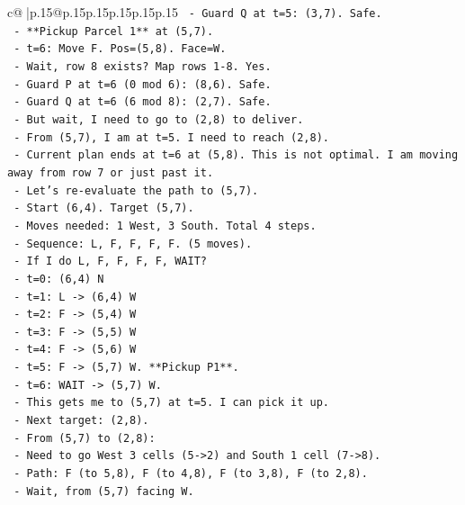 \documentclass{article}
\begin{document}
{\begin{supertabular}{c@{$\;$}|p{.15\linewidth}@{}p{.15\linewidth}p{.15\linewidth}p{.15\linewidth}p{.15\linewidth}p{.15\linewidth}}
{{{\texttt{    {-} Guard Q at t=5: (3,7). Safe.} \\
\texttt{    {-} **Pickup Parcel 1** at (5,7).} \\
\texttt{  {-} t=6: Move F. Pos=(5,8). Face=W.} \\
\texttt{    {-} Wait, row 8 exists? Map rows 1{-}8. Yes.} \\
\texttt{    {-} Guard P at t=6 (0 mod 6): (8,6). Safe.} \\
\texttt{    {-} Guard Q at t=6 (6 mod 8): (2,7). Safe.} \\
\texttt{    {-} But wait, I need to go to (2,8) to deliver.} \\
\texttt{    {-} From (5,7), I am at t=5. I need to reach (2,8).} \\
\texttt{    {-} Current plan ends at t=6 at (5,8). This is not optimal. I am moving away from row 7 or just past it.} \\
\texttt{    {-} Let's re{-}evaluate the path to (5,7).} \\
\texttt{    {-} Start (6,4). Target (5,7).} \\
\texttt{    {-} Moves needed: 1 West, 3 South. Total 4 steps.} \\
\texttt{    {-} Sequence: L, F, F, F, F. (5 moves).} \\
\texttt{    {-} If I do L, F, F, F, F, WAIT?} \\
\texttt{      {-} t=0: (6,4) N} \\
\texttt{      {-} t=1: L {-}> (6,4) W} \\
\texttt{      {-} t=2: F {-}> (5,4) W} \\
\texttt{      {-} t=3: F {-}> (5,5) W} \\
\texttt{      {-} t=4: F {-}> (5,6) W} \\
\texttt{      {-} t=5: F {-}> (5,7) W. **Pickup P1**.} \\
\texttt{      {-} t=6: WAIT {-}> (5,7) W.} \\
\texttt{    {-} This gets me to (5,7) at t=5. I can pick it up.} \\
\texttt{    {-} Next target: (2,8).} \\
\texttt{    {-} From (5,7) to (2,8):} \\
\texttt{      {-} Need to go West 3 cells (5{-}>2) and South 1 cell (7{-}>8).} \\
\texttt{      {-} Path: F (to 5,8), F (to 4,8), F (to 3,8), F (to 2,8).} \\
\texttt{      {-} Wait, from (5,7) facing W.} \\
}}}
\end{supertabular}}
\end{document}
